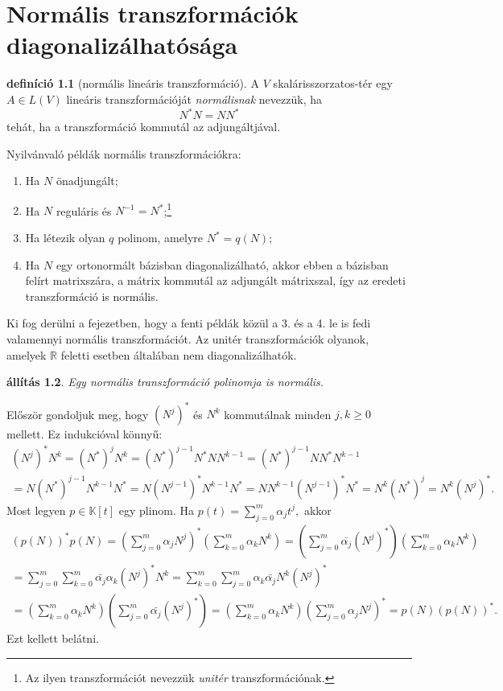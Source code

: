 \documentclass[a4paper, showtrims]{memoir}
\makeatletter
\renewenvironment{proof}[1][\proofname]
    {\par\pushQED{\qed}%
    \normalfont \topsep6\p@\@plus6\p@\relax
    \trivlist
    \item[\hskip\labelsep
        \itshape
    #1\@addpunct{:}]\ignorespaces}
    {\popQED\endtrivlist\@endpefalse}
\theoremstyle{plain}
\newtheorem{proposition}{állítás}[chapter]
\theoremstyle{remark}
\theoremstyle{definition}
\newtheorem{definition}[proposition]{definíció}
\makeatother
\begin{document}
\chapter{Normális transzformációk diagonalizálhatósága}
\begin{definition}[normális lineáris transzformáció]
	A $V$ skalárisszorzatos-tér egy $A\in L\left( V \right)$ lineáris transzformációját
	\emph{normálisnak} nevezzük,
	ha $$N^\ast N=NN^\ast$$ tehát, ha a transzformáció kommutál az adjungáltjával.
\end{definition}
Nyilvánvaló példák normális transzformációkra:
\begin{enumerate}
	\item Ha $N$ önadjungált;
	\item Ha $N$ reguláris és $N^{-1}=N^\ast$;\footnote{Az ilyen transzformációt nevezzük
		      \emph{unitér}
		      transzformációnak.}
	\item Ha létezik olyan $q$ polinom, amelyre $N^\ast=q\left( N \right)$;
	\item
	      Ha $N$ egy ortonormált bázisban diagonalizálható, akkor
	      ebben a bázisban felírt matrixszára, a mátrix kommutál az adjungált mátrixszal,
	      így az eredeti transzformáció is normális.
\end{enumerate}
Ki fog derülni a fejezetben, hogy a fenti példák közül a 3. és a 4. le is fedi valamennyi normális transzformációt.
Az unitér transzformációk olyanok, amelyek $\mathbb{R}$ feletti esetben általában nem diagonalizálhatók.
\begin{proposition}
	Egy normális transzformáció polinomja is normális.
\end{proposition}
\begin{proof}
	Először gondoljuk meg, hogy $(N^j)^\ast$ és $N^k$ kommutálnak minden $j,k≥0$ mellett.
	Ez indukcióval könnyű:
	\begin{multline*}
		(N^j)^\ast N^k
		=
		(N^\ast)^jN^k
		=
		(N^\ast)^{j-1}N^\ast NN^{k-1}
		=
		(N^\ast)^{j-1}NN^\ast N^{k-1}
		\\
		=
		N(N^\ast)^{j-1}N^{k-1}N^\ast
		=
		N(N^{j-1})^\ast N^{k-1}N^\ast
		=
		NN^{k-1}(N^{j-1})^\ast N^\ast
		=
		N^k(N^\ast)^j
		=
		N^k(N^j)^\ast.
	\end{multline*}
	Most legyen $p\in \mathbb{K}[t]$ egy plinom.
	Ha $p\left( t \right)=\sum_{j=0}^m\alpha_jt^j,$
	akkor
	\begin{multline*}
		\left( p\left( N \right) \right)^\ast p\left( N \right)
		=
		\left( \sum_{j=0}^m\alpha_jN^j \right)^\ast
		\left( \sum_{k=0}^m\alpha_kN^k \right)
		=
		\left( \sum_{j=0}^m\bar{\alpha_j}(N^j)^\ast \right)
		\left( \sum_{k=0}^m\alpha_kN^k \right)
		\\
		=
		\sum_{j=0}^m\sum_{k=0}^m\bar{\alpha_j}\alpha_k(N^j)^\ast N^k
		=
		\sum_{k=0}^m\sum_{j=0}^m\alpha_k\bar{\alpha_j}N^k(N^j)^\ast
		\\
		=
		\left( \sum_{k=0}^m\alpha_kN^k \right)
		\left( \sum_{j=0}^m\bar{\alpha_j}(N^j)^\ast \right)
		=
		\left( \sum_{k=0}^m\alpha_kN^k \right)
		\left( \sum_{j=0}^m\alpha_jN^j\right)^\ast
		=
		p\left( N \right)\left( p\left( N \right) \right)^\ast.
	\end{multline*}
	Ezt kellett belátni.
\end{proof}
\end{document}
